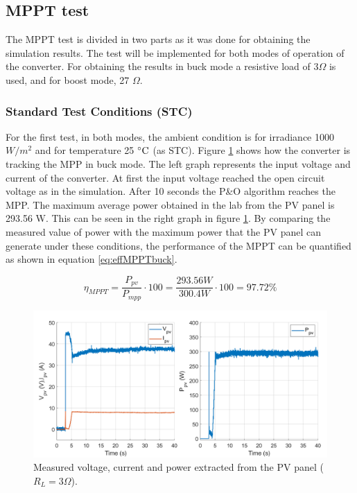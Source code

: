 \subsection{MPPT test}
The MPPT test is divided in two parts as it was done for obtaining the simulation results. The test will be implemented for both modes of operation of the converter. For obtaining the results in buck mode a resistive load of 3$\Omega$ is used, and for boost mode, 27 $\Omega$.

 \subsubsection*{Standard Test Conditions (STC)}
For the first test, in both modes, the ambient condition is for irradiance 1000 $W /m^2$ and for temperature 25 $\decC$ (as STC). Figure \ref{MPPTtestbuckmode1} shows how the converter is tracking the MPP in buck mode. The left graph represents the input voltage and current of the converter. At first the input voltage reached the open circuit voltage as in the simulation.  After 10 seconds the P\&O algorithm reaches the MPP. The maximum average power obtained in the lab from the PV panel is 293.56 W. This can be seen in the right graph in figure \ref{MPPTtestbuckmode1}. By comparing the measured value of power with the maximum power that the PV panel can generate under these conditions, the performance of the MPPT can be quantified as shown in equation \ref{eq:effMPPTbuck}.

\begin{equation} \label{eq:effMPPTbuck}
\eta_{MPPT}= \dfrac{P_{pv}}{P_{mpp}} \cdot 100 = \dfrac{293.56W}{300.4W} \cdot 100 = 97.72\%  
\end{equation}


\begin{figure}[H]
	\begin{center}
		\includegraphics[width=1\textwidth]{../Pictures/P1/Test/Buck_mode_MPPT_Vin_Iin_Pin}
		\caption{Measured voltage, current and power extracted from the PV panel ($R_{L}=3\Omega$).}
		\label{MPPTtestbuckmode1}
	\end{center}	
\end{figure}

